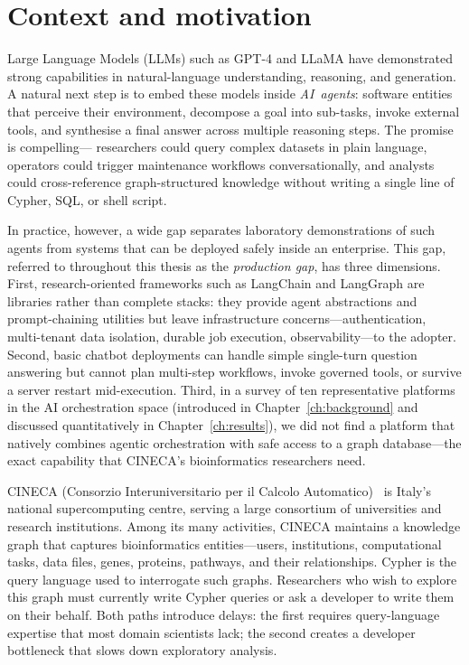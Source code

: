 \documentclass[a4paper,noexaminfo]{sapthesis}
\begin{document}
\section{Context and motivation}
\label{sec:context-motivation}

Large Language Models (LLMs) such as GPT-4 and LLaMA have demonstrated
strong capabilities in natural-language understanding, reasoning, and
generation.  A natural next step is to embed these models inside
\emph{AI~agents}: software entities that perceive their environment,
decompose a goal into sub-tasks, invoke external tools, and synthesise a
final answer across multiple reasoning steps.  The promise is compelling---
researchers could query complex datasets in plain language, operators could
trigger maintenance workflows conversationally, and analysts could
cross-reference graph-structured knowledge without writing a single line of
Cypher, SQL, or shell script.

In practice, however, a wide gap separates laboratory demonstrations of such
agents from systems that can be deployed safely inside an enterprise.  This gap,
referred to throughout this thesis as the \emph{production gap}, has three
dimensions.  First, research-oriented frameworks such as LangChain and
LangGraph are libraries rather than complete stacks: they provide agent
abstractions and prompt-chaining utilities but leave infrastructure
concerns---authentication, multi-tenant data isolation, durable job
execution, observability---to the adopter.  Second, basic chatbot
deployments can handle simple single-turn question answering but cannot plan
multi-step workflows, invoke governed tools, or survive a server restart
mid-execution.  Third, in a survey of ten representative platforms in the AI
orchestration space (introduced in Chapter~\ref{ch:background} and
discussed quantitatively in Chapter~\ref{ch:results}), we did not
find a platform that natively combines agentic orchestration with safe
access to a graph database---the exact capability that CINECA's
bioinformatics researchers need.

CINECA (Consorzio Interuniversitario per il Calcolo
Automatico)~\cite{cineca2023} is Italy's national supercomputing centre,
serving a large consortium of universities and research institutions.  Among its many activities, CINECA maintains a knowledge graph
that captures bioinformatics entities---users, institutions, computational
tasks, data files, genes, proteins, pathways, and their relationships.
Cypher is the query language used to interrogate such graphs.  Researchers
who wish to explore this graph must currently write Cypher queries or ask a
developer to write them on their behalf.  Both paths introduce delays: the first requires query-language
expertise that most domain scientists lack; the second creates a developer
bottleneck that slows down exploratory analysis.
\end{document}

